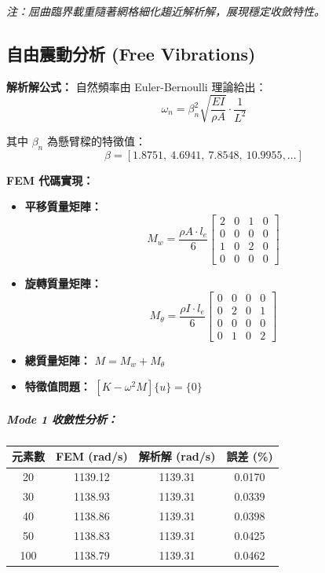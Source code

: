 \documentclass[UTF8, a4paper, 12pt]{ctexart}
\begin{document}
\textit{注：屈曲臨界載重隨著網格細化趨近解析解，展現穩定收斂特性。}

\subsection{自由震動分析 (Free Vibrations)}

\textbf{解析解公式：}
自然頻率由 Euler-Bernoulli 理論給出：
\begin{equation}
  \omega_n = \beta_n^2 \sqrt{\frac{EI}{\rho A}} \cdot \frac{1}{L^2}
\end{equation}

其中 $\beta_n$ 為懸臂樑的特徵值：
\begin{equation}
  \beta = [1.8751,\ 4.6941,\ 7.8548,\ 10.9955,\dots]
\end{equation}

\textbf{FEM 代碼實現：}
\begin{itemize}
  \item \textbf{平移質量矩陣：}
  \begin{equation}
    M_w = \frac{\rho A \cdot l_e}{6} \begin{bmatrix} 2 & 0 & 1 & 0 \\ 0 & 0 & 0 & 0 \\ 1 & 0 & 2 & 0 \\ 0 & 0 & 0 & 0 \end{bmatrix}
  \end{equation}
  \item \textbf{旋轉質量矩陣：}
  \begin{equation}
    M_\theta = \frac{\rho I \cdot l_e}{6} \begin{bmatrix} 0 & 0 & 0 & 0 \\ 0 & 2 & 0 & 1 \\ 0 & 0 & 0 & 0 \\ 0 & 1 & 0 & 2 \end{bmatrix}
  \end{equation}
  \item \textbf{總質量矩陣：} $M = M_w + M_\theta$
  \item \textbf{特徵值問題：} $[K - \omega^2 M] \{u\} = \{0\}$
\end{itemize}

\subparagraph{Mode 1 收斂性分析：}

\begin{center}
\begin{tabular}{cccc}
\toprule
\textbf{元素數} & \textbf{FEM (rad/s)} & \textbf{解析解 (rad/s)} & \textbf{誤差 (\%)} \\
\midrule
20 & 1139.12 & 1139.31 & 0.0170 \\
30 & 1138.93 & 1139.31 & 0.0339 \\
40 & 1138.86 & 1139.31 & 0.0398 \\
50 & 1138.83 & 1139.31 & 0.0425 \\
100 & 1138.79 & 1139.31 & 0.0462 \\
\bottomrule
\end{tabular}
\end{center}
\end{document}

